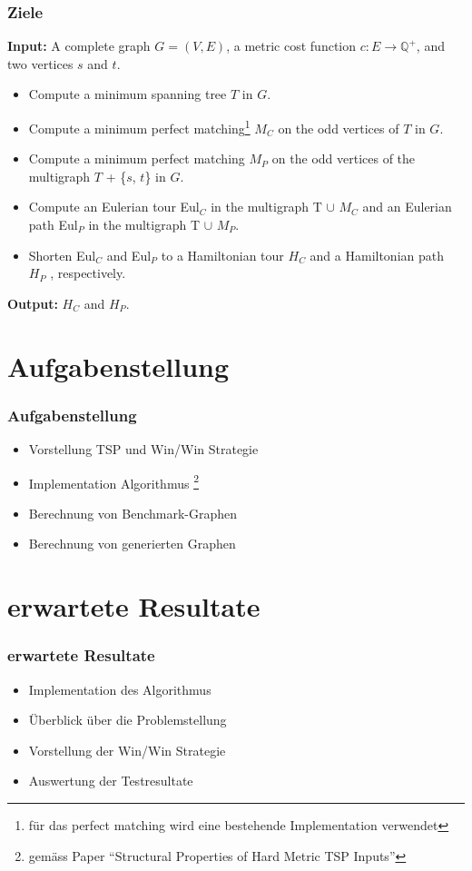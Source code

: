 \documentclass[12pt]{beamer}
\begin{document}
	\begin{frame}
        \frametitle{Ziele}
		\begin{scriptsize}
		\textbf{Input:} A complete graph $G = (V,E)$, a metric cost function $c: E \rightarrow \mathbb{Q}^+$, and two vertices $s$ and $t$.

		\begin{itemize}
			\item[1.] Compute a minimum spanning tree $T$ in $G$.
			\item[2.] Compute a minimum perfect matching\footnote{für das perfect matching wird eine bestehende Implementation verwendet} $M_C$ on the odd vertices of $T$ in $G$.
			\item[3.] Compute a minimum perfect matching $M_P$ on the odd vertices of the multigraph $T$ + \{$s$, $t$\} in $G$.
			\item[4.] Compute an Eulerian tour Eul$_C$ in the multigraph T $\cup$ $M_C$ and an Eulerian path Eul$_P$ in the multigraph T $\cup$ $M_P$.
			\item[5.] Shorten Eul$_C$ and Eul$_P$ to a Hamiltonian tour $H_C$ and a Hamiltonian path $H_P$ , respectively.  
		\end{itemize}
	\textbf{Output:} $H_C$ and $H_P$.
	\end{scriptsize}
    \end{frame}

	\section{Aufgabenstellung}
	\begin{frame}
        \frametitle{Aufgabenstellung}
		\begin{itemize}
			\item Vorstellung TSP und Win/Win Strategie
			\item Implementation Algorithmus \footnote{gemäss Paper "`Structural Properties of Hard Metric TSP Inputs"'}
			\item Berechnung von Benchmark-Graphen
			\item Berechnung von generierten Graphen
		\end{itemize}
    \end{frame}

	\section{erwartete Resultate}
	\begin{frame}
        \frametitle{erwartete Resultate}
		\begin{itemize}
			\item Implementation des Algorithmus
			\item Überblick über die Problemstellung
			\item Vorstellung der Win/Win Strategie
			\item Auswertung der Testresultate
		\end{itemize}
    \end{frame}
\end{document}
